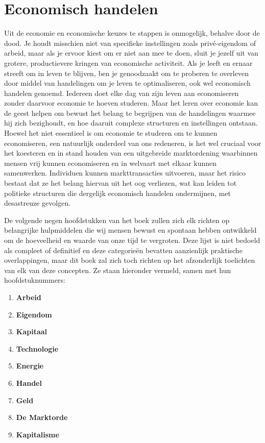 \section{Economisch handelen}

Uit de economie en economische keuzes te stappen is onmogelijk, behalve
door de dood. Je houdt misschien niet van specifieke instellingen zoals
privé-eigendom of arbeid, maar als je ervoor kiest om er niet aan mee te
doen, sluit je jezelf uit van grotere, productievere kringen van
economische activiteit. Als je leeft en ernaar streeft om in leven te
blijven, ben je genoodzaakt om te proberen te overleven door middel van
handelingen om je leven te optimaliseren, ook wel economisch handelen
genoemd. Iedereen doet elke dag van zijn leven aan economiseren zonder
daarvoor economie te hoeven studeren. Maar het leren over economie kan
de geest helpen om bewust het belang te begrijpen van de handelingen
waarmee hij zich bezighoudt, en hoe daaruit complexe structuren en
instellingen ontstaan. Hoewel het niet essentieel is om economie te studeren om te kunnen economiseren, een natuurlijk onderdeel van ons redeneren, is het wel cruciaal voor het koesteren en in stand houden van een uitgebreide marktordening waarbinnen mensen vrij kunnen economiseren en in welvaart met elkaar kunnen samenwerken. Individuen kunnen markttransacties uitvoeren, maar het risico bestaat dat ze het belang hiervan uit het oog verliezen, wat kan leiden tot politieke structuren die dergelijk economisch handelen ondermijnen, met desastreuze gevolgen.

De volgende negen hoofdstukken van het boek zullen zich elk richten op
belangrijke hulpmiddelen die wij mensen bewust en spontaan hebben
ontwikkeld om de hoeveelheid en waarde van onze tijd te vergroten. Deze
lijst is niet bedoeld als compleet of definitief en deze categorieën
bevatten aanzienlijk praktische overlappingen, maar dit boek zal zich
toch richten op het afzonderlijk toelichten van elk van deze concepten.
Ze staan hieronder vermeld, samen met hun hoofdstuknummers:

\begin{multicols}{2}
\begin{enumerate}
\footnotesize\centering
\def\labelenumi{\arabic{enumi}.}
\setcounter{enumi}{3}
\item
  \textbf{Arbeid}
\item
  \textbf{Eigendom}
\item
  \textbf{Kapitaal}
\item
  \textbf{Technologie}
\item
  \textbf{Energie}
\item
  \textbf{Handel}
\item
  \textbf{Geld}
\item
  \textbf{De Marktorde}
\item
  \textbf{Kapitalisme}
\end{enumerate}
\end{multicols}

